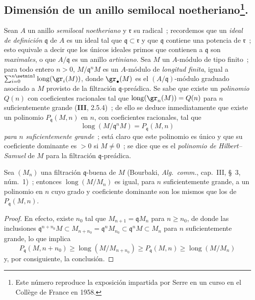 \subsection[Dimensión de un anillo semilocal noetheriano]{Dimensión de un
anillo semilocal noetheriano\protect\footnote{Este número reproduce la exposición
impartida por Serre en un curso en el Collège de France en 1958.}.}
\label{subsection:0.16.2-es}

\begin{env}[16.2.1]
\label{0.16.2.1-es}
Sean $A$ un anillo \emph{semilocal noetheriano} y $\mathfrak{r}$ su radical~;
recordemos que un \emph{ideal de definición} $\mathfrak{q}$ de $A$ es un ideal tal que
$\mathfrak{q}\subset\mathfrak{r}$ y que $\mathfrak{q}$ contiene una potencia de
$\mathfrak{r}$~; esto equivale a decir que los únicos ideales primos que
contienen a $\mathfrak{q}$ son \emph{maximales}, o que $A/\mathfrak{q}$ es un anillo
\emph{artiniano}. Sea $M$ un $A$-módulo de tipo finito~; para todo entero $n>0$,
$M/\mathfrak{q}^nM$ es un $A$-módulo de \emph{longitud finita}, igual a
$\sum_{i=0}^{n\setmin 1}\operatorname{long}(\gr_i(M))$, donde $\gr_\bullet(M)$ es el
$(A/\mathfrak{q})$-módulo graduado asociado a $M$ provisto de la filtración
$\mathfrak{q}$-preádica. Se sabe que existe un \emph{polinomio} $Q(n)$ con
coeficientes racionales tal que $\operatorname{long}(\gr_n(M))=Q(n)$ para $n$
suficientemente grande (\textbf{III}, 2.5.4)~; de ello se deduce inmediatamente que
existe un polinomio $P_{\mathfrak{q}}(M,n)$ en $n$, con coeficientes racionales,
tal que
\[
  \operatorname{long}(M/\mathfrak{q}^nM)=P_{\mathfrak{q}}(M,n)
\]
\emph{para $n$ suficientemente grande}~; está claro que este polinomio es único y que
su coeficiente dominante es $>0$ si $M\neq0$~; se dice que es el \emph{polinomio de
Hilbert--Samuel} de $M$ para la filtración $\mathfrak{q}$-preádica.
\end{env}

\begin{lemma}[16.2.2.1]
\label{0.16.2.2.1-es}
Sea $(M_n)$ una filtración $\mathfrak{q}$-buena de $M$ \textup{(Bourbaki,
\emph{Alg.~comm.}, cap.~III, \S~3, núm.~1)}~; entonces
$\operatorname{long}(M/M_n)$ es igual, para $n$ suficientemente grande, a un
polinomio en $n$ cuyo grado y coeficiente dominante son los mismos que los de
$P_{\mathfrak{q}}(M,n)$.
\end{lemma}

\begin{proof}
En efecto, existe $n_0$ tal que $M_{n+1}=\mathfrak{q}M_n$ para $n\geq n_0$,
de donde las inclusiones
$\mathfrak{q}^{n+n_0}M\subset M_{n+n_0}=\mathfrak{q}^nM_{n_0}
\subset\mathfrak{q}^nM\subset M_n$ para $n$ suficientemente grande, lo que
implica
\[
  P_{\mathfrak{q}}(M,n+n_0)\geq
  \operatorname{long}(M/M_{n+n_0})\geq
  P_{\mathfrak{q}}(M,n)\geq\operatorname{long}(M/M_n)
\]
y, por consiguiente, la conclusión.
\end{proof}

